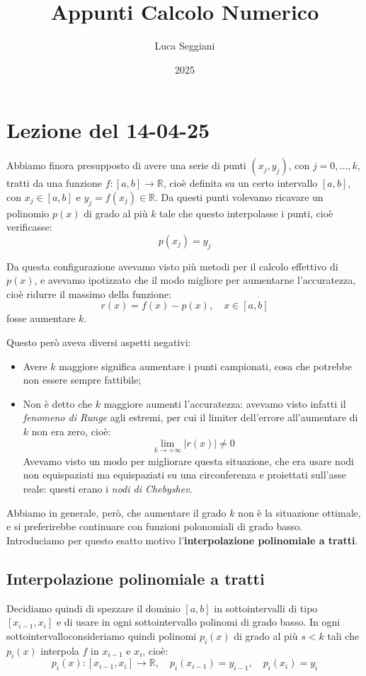\documentclass[a4paper,11pt]{article}
\title{Appunti Calcolo Numerico}
\author{Luca Seggiani}
\date{2025}
\begin{document}
\section{Lezione del 14-04-25}

\thispagestyle{empty}
\pagestyle{fancy}

Abbiamo finora presupposto di avere una serie di punti $(x_j, y_j)$, con $j = 0, ..., k$, tratti da una funzione $f : [a, b] \rightarrow \mathbb{R}$, cioè definita su un certo intervallo $[a, b]$, con $x_j \in [a, b]$ e $y_j = f(x_j) \in \mathbb{R}$.
Da questi punti volevamo ricavare un polinomio $p(x)$ di grado al più $k$ tale che questo interpolasse i punti, cioè verificasse:
$$
p(x_j) = y_j
$$

Da questa configurazione avevamo visto più metodi per il calcolo effettivo di $p(x)$, e avevamo ipotizzato che il modo migliore per aumentarne l'accuratezza, cioè ridurre il massimo della funzione:
$$
r(x) = f(x) - p(x), \quad x \in [a, b]
$$
fosse aumentare $k$.

Questo però aveva diversi aspetti negativi:
\begin{itemize}
	\item Avere $k$ maggiore significa aumentare i punti campionati, cosa che potrebbe non essere sempre fattibile;
	\item Non è detto che $k$ maggiore aumenti l'accuratezza: avevamo visto infatti il \textit{fenomeno di Runge} agli estremi, per cui il limiter dell'errore all'aumentare di $k$ non era zero, cioè:
		$$
		\lim_{k \rightarrow +\infty} |r(x)| \neq 0
		$$
		Avevamo visto un modo per migliorare questa situazione, che era usare nodi non equispaziati ma equispaziati su una circonferenza e proiettati sull'asse reale: questi erano i \textit{nodi di Chebyshev}. 
\end{itemize}

Abbiamo in generale, però, che aumentare il grado $k$ non è la situazione ottimale, e si preferirebbe continuare con funzioni polonomiali di grado basso.
Introduciamo per questo esatto motivo l'\textbf{interpolazione polinomiale a tratti}.

\subsection{Interpolazione polinomiale a tratti}
Decidiamo quindi di spezzare il dominio $[a, b]$ in sottointervalli di tipo $[x_{i - 1}, x_i]$ e di usare in ogni sottointervallo polinomi di grado basso.
In ogni sottointervalloconsideriamo quindi polinomi $p_i(x)$ di grado al più $s < k$ tali che $p_i(x)$ interpola $f$ in $x_{i - 1}$ e $x_i$, cioè:
$$
p_i(x) : [x_{i - 1}, x_i] \rightarrow \mathbb{R}, \quad p_i(x_{i - 1}) = y_{i - 1}, \quad p_i(x_i) = y_i
$$
\end{document}
